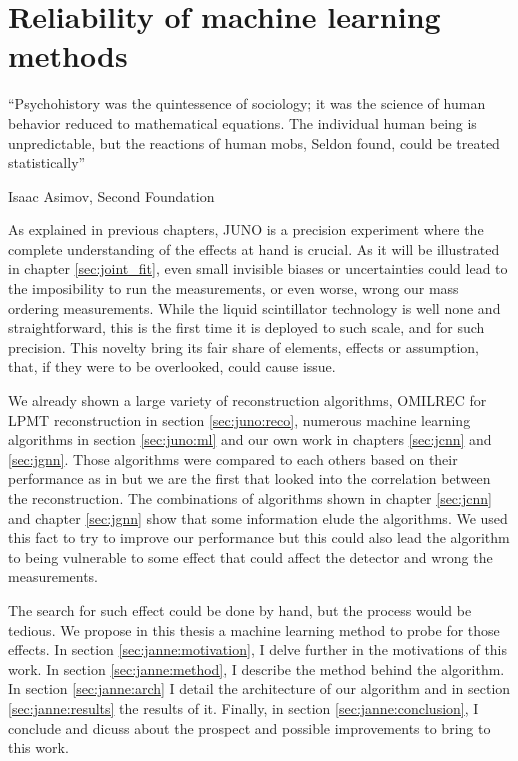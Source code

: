 \documentclass[../main.tex]{subfiles}
\begin{document}
\chapter{Reliability of machine learning methods}
\label{sec:janne}

\epigraph{``Psychohistory was the quintessence of sociology; it was the science of human behavior reduced to mathematical equations. The individual human being is unpredictable, but the reactions of human mobs, Seldon found, could be treated statistically''}{Isaac Asimov, Second Foundation}

\minitoc

As explained in previous chapters, JUNO is a precision experiment where the complete understanding of the effects at hand is crucial. As it will be illustrated in chapter \ref{sec:joint_fit}, even small invisible biases or uncertainties could lead to the imposibility to run the measurements, or even worse, wrong our mass ordering measurements. While the liquid scintillator technology is well none and straightforward, this is the first time it is deployed to such scale, and for such precision. This novelty bring its fair share of elements, effects or assumption, that, if they were to be overlooked, could cause issue.

We already shown a large variety of reconstruction algorithms, OMILREC for LPMT reconstruction in section \ref{sec:juno:reco}, numerous machine learning algorithms in section \ref{sec:juno:ml} and our own work in chapters \ref{sec:jcnn} and \ref{sec:jgnn}. Those algorithms were compared to each others based on their performance as in \cite{qian_vertex_2021} but we are the first that looked into the correlation between the reconstruction. The combinations of algorithms shown in chapter \ref{sec:jcnn} and chapter \ref{sec:jgnn} show that some information elude the algorithms. We used this fact to try to improve our performance but this could also lead the algorithm to being vulnerable to some effect that could affect the detector and wrong the measurements.

The search for such effect could be done by hand, but the process would be tedious. We propose in this thesis a machine learning method to probe for those effects. In section \ref{sec:janne:motivation}, I delve further in the motivations of this work. In section \ref{sec:janne:method}, I describe the method behind the algorithm. In section \ref{sec:janne:arch} I detail the architecture of our algorithm and in section \ref{sec:janne:results} the results of it. Finally, in section \ref{sec:janne:conclusion}, I conclude and dicuss about the prospect and possible improvements to bring to this work.
\end{document}
